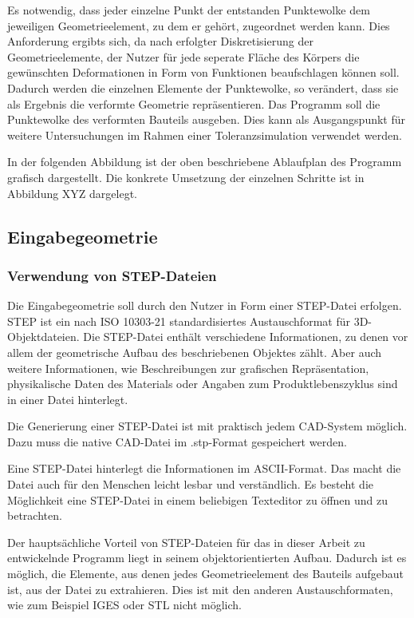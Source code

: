 Es notwendig, dass jeder einzelne Punkt der entstanden Punktewolke dem jeweiligen Geometrieelement, zu dem er gehört, zugeordnet werden kann. Dies Anforderung ergibts sich, da nach erfolgter Diskretisierung der Geometrieelemente, der Nutzer für jede seperate Fläche des Körpers die gewünschten Deformationen in Form von Funktionen  beaufschlagen können soll. Dadurch werden die einzelnen Elemente der Punktewolke, so verändert, dass sie als Ergebnis die verformte Geometrie repräsentieren. 
Das Programm soll die Punktewolke des verformten Bauteils ausgeben. Dies kann als Ausgangspunkt für weitere Untersuchungen im Rahmen einer Toleranzsimulation verwendet werden. 

In der folgenden Abbildung ist der oben beschriebene Ablaufplan des Programm grafisch dargestellt. Die konkrete Umsetzung der einzelnen Schritte ist in Abbildung XYZ dargelegt.        
 
\subsection{Eingabegeometrie} 
\label{sec:eingabegeometrie}

\subsubsection{Verwendung von STEP-Dateien}
 
Die Eingabegeometrie soll durch den Nutzer in Form einer STEP-Datei erfolgen. STEP ist ein nach ISO 10303-21 standardisiertes Austauschformat für 3D-Objektdateien. Die STEP-Datei enthält verschiedene Informationen, zu denen vor allem der geometrische Aufbau des beschriebenen Objektes zählt. Aber auch weitere Informationen, wie Beschreibungen zur grafischen Repräsentation, physikalische Daten des Materials oder Angaben zum Produktlebenszyklus sind in einer Datei hinterlegt. 

Die Generierung einer STEP-Datei ist mit praktisch jedem CAD-System möglich. Dazu muss die native CAD-Datei im .stp-Format gespeichert werden.

Eine STEP-Datei hinterlegt die Informationen im ASCII-Format. Das macht die Datei auch für den Menschen leicht lesbar und verständlich. Es besteht die Möglichkeit eine STEP-Datei in einem beliebigen Texteditor zu öffnen und zu betrachten. 

Der hauptsächliche Vorteil von STEP-Dateien für das in dieser Arbeit zu entwickelnde Programm liegt in seinem objektorientierten Aufbau. Dadurch ist es möglich, die Elemente, aus denen jedes Geometrieelement des Bauteils aufgebaut ist, aus der Datei zu extrahieren. Dies ist mit den anderen Austauschformaten, wie zum Beispiel IGES oder STL nicht möglich. 


